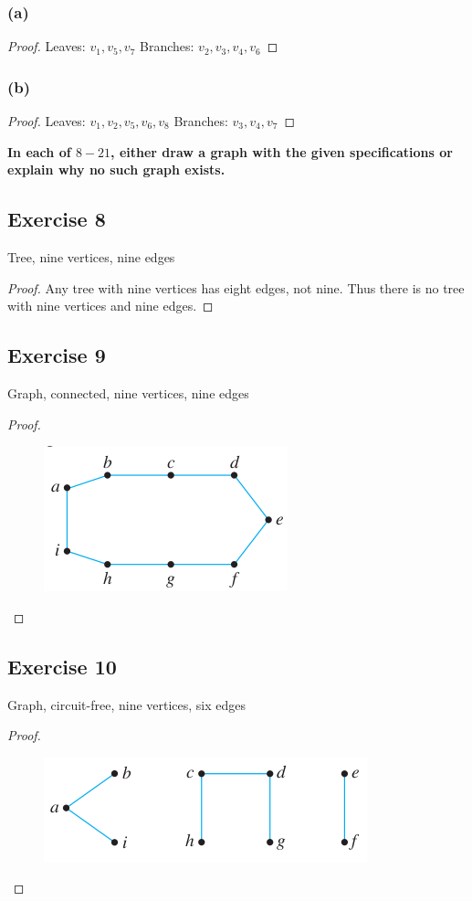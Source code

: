 \documentclass[14pt]{extarticle}
\newcommand{\cy}{\color{cyan}}
\begin{document}
\subsubsection{(a)}
\begin{proof}
Leaves: \(v_1, v_5, v_7\) Branches: \(v_2, v_3, v_4, v_6\)
\end{proof}

\subsubsection{(b)}

\begin{proof}
Leaves: \(v_1, v_2, v_5, v_6, v_8\) Branches: \(v_3, v_4, v_7\)
\end{proof}

{\bf \cy In each of \(8-21\), either draw a graph with the given specifications or explain why no such graph exists.}

\subsection{Exercise 8}
Tree, nine vertices, nine edges
\begin{proof}
Any tree with nine vertices has eight edges, not nine. Thus there is no tree with nine vertices and nine edges.
\end{proof}

\subsection{Exercise 9}
Graph, connected, nine vertices, nine edges
\begin{proof}
\begin{figure}[ht!]
\centering
\includegraphics[scale=0.5]{../images/10.4.9.png}
\end{figure}
\end{proof}

\subsection{Exercise 10}
Graph, circuit-free, nine vertices, six edges
\begin{proof}
\begin{figure}[ht!]
\centering
\includegraphics[scale=0.5]{../images/10.4.10.png}
\end{figure}
\end{proof}
\end{document}
